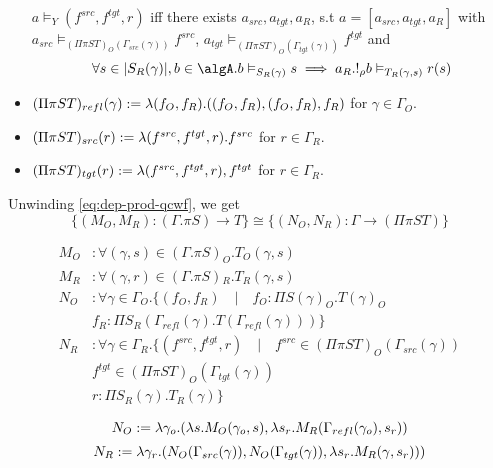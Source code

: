 \documentclass[12pt,a4paper]{article}
\def\src{_{src}}\alwaysmath{src}
\def\rfl{_{refl}}\alwaysmath{rfl}
\def\tgt{_{tgt}}\alwaysmath{tgt}
\renewcommand{\O}{_{O}}
\newcommand{\R}{\ensuremath{_{R}}}
\begin{document}
\begin{itemize}
    \subitem $a \vDash_Y (f^{src}, f^{tgt}, r)$ iff there exists $a\src, a\tgt, a\R$, s.t $a = [a\src, a\tgt, a\R]$ with $a\src \vDash_{(\Pi\pi S T)\O(\Gamma\src(\gamma))} f^{src}$, $a\tgt \vDash_{(\Pi\pi S T)\O(\Gamma\tgt(\gamma))} f^{tgt}$ and
    $$\forall s \in \carr{S\R(\gamma)}, b \in \algA. b \vDash_{S\R(\gamma)} s \implies a\R . !_\rho b \vDash_{T\R(\gamma,s)} r(s)$$
     

    \item $(\Pi \pi S T)\rfl(\gamma) \define \lambda (f\O, f\R). ((f\O, f\R), (f\O, f\R), f\R) $ for $\gamma \in \Gamma\O$.
    
    \item $(\Pi \pi S T)\src(r) \define \lambda (f^{src}, f^{tgt}, r). f^{src}$ for $r \in \Gamma\R$.
    
    \item $(\Pi \pi S T)\tgt(r) \define \lambda (f^{src}, f^{tgt}, r), f^{tgt}$ for $r \in \Gamma\R$.
\end{itemize}

\pagebreak

Unwinding \cref{eq:dep-prod-qcwf}, we get 
$$\{(M\O,M\R) : (\Gamma. \pi S) \to T \} \cong \{(N\O, N\R) : \Gamma \to (\Pi \pi S T)\}$$

\begin{align*}
  M\O &: \forall (\gamma, s) \in (\Gamma. \pi S)\O . T\O(\gamma, s) \\
  M\R &: \forall (\gamma, r) \in (\Gamma. \pi S)\R . T\R(\gamma, s) \\
  N\O &: \forall \gamma \in \Gamma\O . \{ (f\O , f\R) \quad|\quad f\O : \Pi S(\gamma)\O.T(\gamma)\O\\
  &  f\R : \Pi S\R (\Gamma\rfl(\gamma).T(\Gamma\rfl(\gamma))) \} \\
  N\R &: \forall \gamma \in \Gamma\R. \{ (f^{src}, f^{tgt} , r) \quad|\quad  f^{src} \in (\Pi \pi S T)\O(\Gamma\src(\gamma))\\
  &   f^{tgt} \in (\Pi \pi S T)\O(\Gamma\tgt(\gamma))\\
  &   r : \Pi S\R (\gamma).T\R(\gamma)\}
\end{align*}

$$N\O \define \lambda \gamma_o . (\lambda s. M\O(\gamma_o, s), \lambda s_r. M\R(\Gamma\rfl(\gamma_o), s_r))$$
$$N\R \define \lambda \gamma_r . ( N\O(\Gamma\src(\gamma)), N\O(\Gamma\tgt(\gamma)),  \lambda s_r. M\R(\gamma, s_r)) )$$
\end{document}
